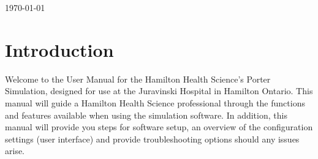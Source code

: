 \documentclass[paper=letter, fontsize=10pt]{scrartcl}
\numberwithin{equation}{section}		%
\numberwithin{figure}{section}			%
\numberwithin{table}{section}				%
\begin{document}
\begin{titlepage}
\begin{center}


{\large \today}\\[3cm] %


 

\vfill %
\end{center}
\end{titlepage}

\setcounter{tocdepth}{2}

\tableofcontents

\newpage
\section{Introduction}
Welcome to the User Manual for the Hamilton Health Science's Porter Simulation, designed for use at the Juravinski Hospital in Hamilton Ontario. This manual will guide a Hamilton Health Science professional through the functions and features available when using the simulation software. In addition, this manual will provide you steps for software setup, an overview of the configuration settings (user interface) and provide troubleshooting options should any issues arise.
\end{document}
